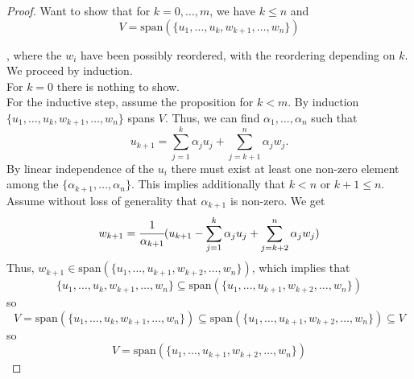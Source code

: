 \documentclass[12pt]{article}
\newcommand\set[1]{\{#1\}}
\begin{document}
\begin{proof}
  Want to show that for $k = 0,\dots, m$, we have $k \leq n$ and
  \begin{equation*}
    V = \text{span}(\set{u_1, \dots, u_k, w_{k+1}, \dots, w_n})
  \end{equation*}

  , where the $w_i$ have been possibly reordered, with the reordering depending on $k$. We  proceed by induction. \\
  For $k=0$ there is nothing to show. \\
  For the inductive step, assume the proposition for $k<m$. By induction $ \set{u_1, \dots, u_k, w_{k+1}, \dots, w_n}$ spans $V$. Thus, we can find $\alpha_1, \dots, \alpha_n$ such that
  \begin{equation*}
    u_{k+1} = \sum\limits_{j=1}^k \alpha_ju_j + \sum\limits_{j={k+1}}^n \alpha_j w_j.
  \end{equation*}
  By linear independence of the $u_i$ there must exist at least one non-zero element among the $\set{\alpha_{k+1}, \dots, \alpha_n}$. This implies additionally that $k<n$ or $k+1 \leq n$. Assume without loss of generality that $\alpha_{k+1}$ is non-zero. We get
  \begin{equation*}
    w_{k+1} = \cfrac{1}{\alpha_{k+1}}(u_{k+1} -  \sum\limits_{j=1}^k \alpha_ju_j + \sum\limits_{j={k+2}}^n \alpha_j w_j)
  \end{equation*}
  Thus, $w_{k+1} \in  \text{span}(\set{u_1, \dots, u_{k+1},  w_{k+2}, \dots, w_n})$, which implies that
  \begin{equation*}
    \set{u_1, \dots,  u_k, w_{k+1}, \dots, w_n} \subseteq \text{span}(\set{u_1, \dots, u_{k+1},  w_{k+2}, \dots, w_n})
  \end{equation*}
  so
  \begin{equation*}
    V = \text{span}(\set{u_1, \dots,  u_k, w_{k+1}, \dots, w_n}) \subseteq \text{span}(\set{u_1, \dots, u_{k+1},  w_{k+2}, \dots, w_n}) \subseteq V
  \end{equation*}
  so
  \begin{equation*}
    V = \text{span}(\set{u_1, \dots, u_{k+1},  w_{k+2}, \dots, w_n})
  \end{equation*}
\end{proof}
\end{document}

